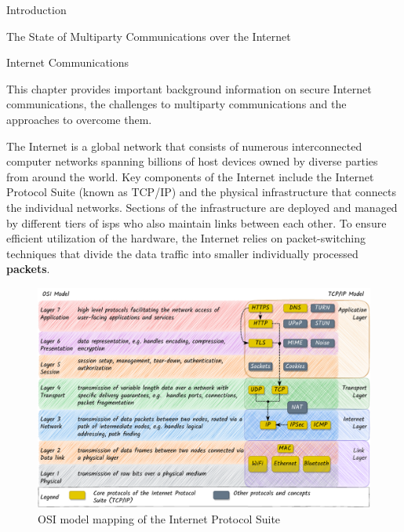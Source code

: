 \begin{frame}
\tableofcontents

\todototoc

\listoftodos

\printnoidxglossary[type=\acronymtype,title=Glossary]

\listoffigures

\mainmatter

\begin{block}{Introduction}
\protect\hypertarget{introduction}{}
\end{block}
\end{frame}

\begin{frame}[fragile]{The State of Multiparty Communications over the
Internet}
\protect\hypertarget{the-state-of-multiparty-communications-over-the-internet}{}

\begin{block}{Internet Communications}
\protect\hypertarget{sec:internet}{}

This chapter provides important background information on secure
Internet communications, the challenges to multiparty communications and
the approaches to overcome them.

The Internet is a global network that consists of numerous
interconnected computer networks spanning billions of host devices owned
by diverse parties from around the world. Key components of the Internet
include the Internet Protocol Suite (known as TCP/IP) and the physical
infrastructure that connects the individual networks. Sections of the
infrastructure are deployed and managed by different tiers of
\glspl{isp} who also maintain links between each other. To ensure
efficient utilization of the hardware, the Internet relies on
packet-switching techniques that divide the data traffic into smaller
individually processed \textbf{packets}.

\begin{figure}
\centering
\includegraphics[width=1\textwidth,height=\textheight]{thesis/../figures/osi-map-tcp.drawio.pdf}
\caption{OSI model mapping of the Internet Protocol
Suite\label{osi-map-tcp}}
\end{figure}


\end{block}
\end{frame}
